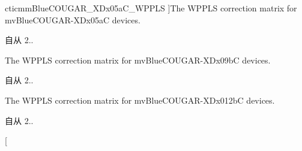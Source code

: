 \begin{Desc}
\begin{description}
{\hypertarget{group___common_interface_gga514bdc683ef27995fdeba04aec25f571ad0d8310a42b5ee0fb793a5089a6885be}{cticmm\+Blue\+C\+O\+U\+G\+A\+R\+\_\+\+X\+Dx05a\+C\+\_\+\+W\+P\+P\+L\+S}\label{group___common_interface_gga514bdc683ef27995fdeba04aec25f571ad0d8310a42b5ee0fb793a5089a6885be}
}]The W\+P\+P\+L\+S correction matrix for mv\+Blue\+C\+O\+U\+G\+A\+R-\/\+X\+Dx05a\+C devices. \begin{DoxySince}{自从}
2.. 
\end{DoxySince}
\item[{\em 
\hypertarget{group___common_interface_gga514bdc683ef27995fdeba04aec25f571a08c9143be091a2d118e628555184cd24}{cticmm\+Blue\+C\+O\+U\+G\+A\+R\+\_\+\+X\+Dx09b\+C\+\_\+\+W\+P\+P\+L\+S}\label{group___common_interface_gga514bdc683ef27995fdeba04aec25f571a08c9143be091a2d118e628555184cd24}
}]The W\+P\+P\+L\+S correction matrix for mv\+Blue\+C\+O\+U\+G\+A\+R-\/\+X\+Dx09b\+C devices. \begin{DoxySince}{自从}
2.. 
\end{DoxySince}
\item[{\em 
\hypertarget{group___common_interface_gga514bdc683ef27995fdeba04aec25f571afc492289885a7ce6f401cff7b1a09018}{cticmm\+Blue\+C\+O\+U\+G\+A\+R\+\_\+\+X\+Dx012b\+C\+\_\+\+W\+P\+P\+L\+S}\label{group___common_interface_gga514bdc683ef27995fdeba04aec25f571afc492289885a7ce6f401cff7b1a09018}
}]The W\+P\+P\+L\+S correction matrix for mv\+Blue\+C\+O\+U\+G\+A\+R-\/\+X\+Dx012b\+C devices. \begin{DoxySince}{自从}
2.. 
\end{DoxySince}
\item[{\em 
}
\end{description}
\end{Desc}
